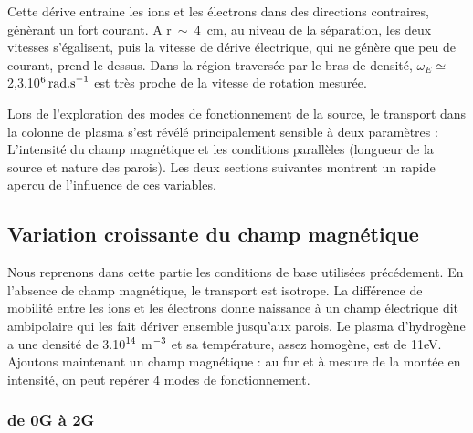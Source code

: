 \begin{refsection}
Cette dérive entraine les ions et les électrons dans des directions
contraires, génèrant un fort courant. A r~$\sim$~4~cm, au niveau de la
séparation, les deux vitesses s'égalisent, puis la vitesse de dérive électrique, qui ne
génère que peu de courant, prend le dessus. Dans la région traversée par le bras
de densité, $\omega_E\simeq$ 2,3.10$^{{6}}\,\text{rad.s}^{{-1}}$
est très proche de la vitesse de rotation mesurée.

Lors de l'exploration des modes de fonctionnement de la source, le transport
dans la colonne de plasma s'est révélé principalement sensible à deux
paramètres : L'intensité du champ magnétique et les conditions parallèles 
(longueur de la source et nature des parois). Les deux sections suivantes
montrent un rapide apercu de l'influence de ces variables.

\subsection{Variation croissante du champ magnétique}
Nous reprenons dans cette partie les conditions de base utilisées précédement.
En l'absence de champ magnétique, le transport est isotrope. La différence de
mobilité entre les ions et les électrons donne naissance à un champ électrique
dit ambipolaire qui les fait dériver ensemble jusqu'aux parois. Le plasma
d'hydrogène a une densité de 3.10$^{{14}}$ m$^{{-3}}$ et sa
température, assez homogène, est de 11eV. Ajoutons maintenant un champ
magnétique : au fur et à mesure de la montée en intensité, on peut repérer 4
modes de fonctionnement.

\subsubsection{de 0G à 2G}


\end{refsection}
